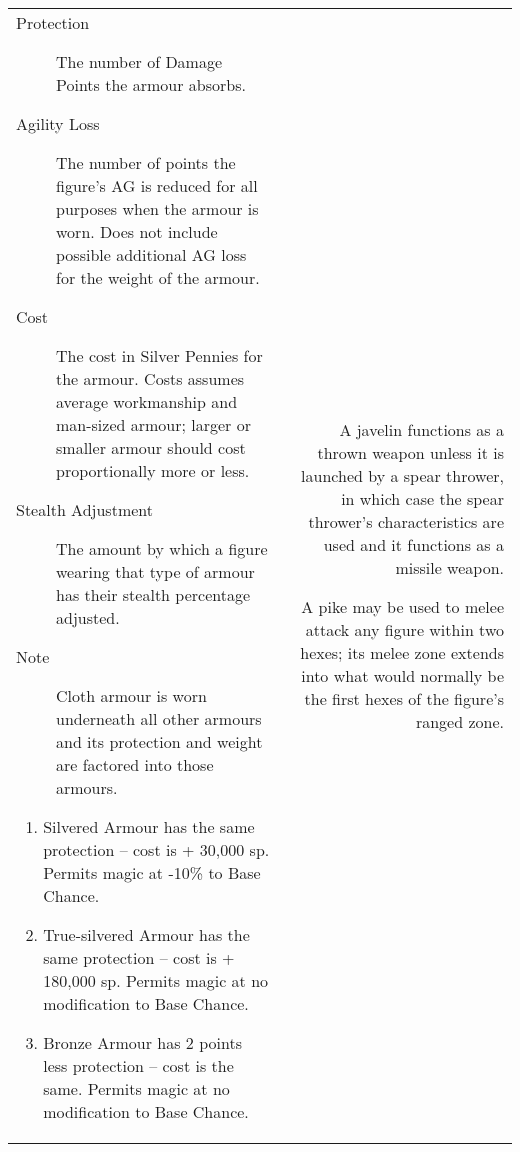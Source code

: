 \begin{tabular}[t]{l|r}
\begin{minipage}[t]{4.6in}
\begin{multicols}{2}
{\begin{description}
\item[Protection] The number of Damage Points the armour absorbs.

\item[Agility Loss] The number of points the figure's AG is reduced
for all purposes when the armour is worn.  Does not include possible
additional AG loss for the weight of the armour.

\item[Cost] The cost in Silver Pennies for the armour.  Costs assumes
average workmanship and man-sized armour; larger or smaller armour
should cost proportionally more or less.

\item[Stealth Adjustment] The amount by which a figure wearing
that type of armour has their stealth percentage adjusted.

\item[Note] Cloth armour is worn underneath all other armours and its
protection and weight are factored into those armours.
\end{description}}

{\setlength\leftmargini{3.0em}
\begin{enumerate}
\setlength\itemsep{0pt}
\item
Silvered Armour has the same protection -- cost is + 30,000 sp.
Permits magic at -10\% to Base Chance.

\item
True-silvered Armour has the same protection -- cost is + 180,000 sp.
Permits magic at no modification to Base Chance.

\item
Bronze Armour has 2 points less protection -- cost is the same.
Permits magic at no modification to Base Chance.
\end{enumerate}}
\end{multicols}
\end{minipage}

& 

\begin{minipage}[t]{2.2in}
{\setlength\leftmargini{0pt}
\begin{description}
\setlength\itemsep{0pt}

\item[I] A javelin functions as a thrown weapon unless it is launched
by a spear thrower, in which case the spear thrower's characteristics
are used and it functions as a missile weapon.

\item[J] A pike may be used to melee attack any figure within two
hexes; its melee zone extends into what would normally be the first
hexes of the figure's ranged zone.


\end{description}}
\end{minipage}
\end{tabular}
